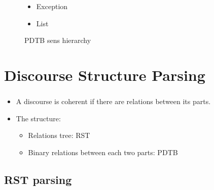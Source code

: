 \documentclass[xcolor=table]{beamer}
\begin{document}
\begin{frame}
\begin{figure}
\begin{tcolorbox}[colback=white, colframe=blue, boxrule=1pt, text width=.9\textwidth]
\begin{minipage}{.3\textwidth}
\begin{itemize}
\begin{itemize}
\begin{itemize}
						\item Conjunction
						\item Disjunction
						\item Chosen Alternative
					\end{itemize}
					\item Exception
					\item List
				\end{itemize}
			\end{itemize}
		\end{minipage}\vspace{-6pt}
		\end{tcolorbox}\vspace{-6pt}
		\caption{PDTB sens hierarchy \cite{2008-prasad-al}}
	\end{figure}
	
\end{frame}

\section{Discourse Structure Parsing}

\begin{frame}
	\frametitle{\insertshortsubtitle}
	\framesubtitle{\insertsection}
	
	\begin{itemize}
		\item A discourse is coherent if there are relations between its parts.
		\item The structure:
		\begin{itemize}
			\item Relations tree: RST
			\item Binary relations between each two parts: PDTB
		\end{itemize}
	\end{itemize}
	
\end{frame}

\subsection{RST parsing}
\end{document}
